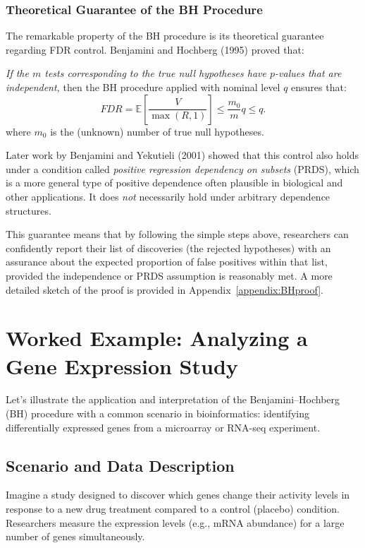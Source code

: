 \documentclass[12pt]{book}
\newcommand{\E}{\mathbb{E}}              %
\newcommand{\FDR}{{FDR}}    %
\newcommand{\pvalue}{$p$-value}          %
\begin{document}
\subsection{Theoretical Guarantee of the BH Procedure}
The remarkable property of the BH procedure is its theoretical guarantee regarding FDR control. Benjamini and Hochberg (1995) proved that:

\emph{If the $m$ tests corresponding to the true null hypotheses have \pvalue s that are independent,} then the BH procedure applied with nominal level $q$ ensures that:
\begin{equation}
  \FDR = \E\left[ \frac{V}{\max(R,1)} \right] \le \frac{m_0}{m} q \le q. \label{eq:bh_control}
\end{equation}
where $m_0$ is the (unknown) number of true null hypotheses.

Later work by Benjamini and Yekutieli (2001) showed that this control also holds under a condition called \emph{positive regression dependency on subsets} (PRDS), which is a more general type of positive dependence often plausible in biological and other applications. It does \emph{not} necessarily hold under arbitrary dependence structures.

This guarantee means that by following the simple steps above, researchers can confidently report their list of discoveries (the rejected hypotheses) with an assurance about the expected proportion of false positives within that list, provided the independence or PRDS assumption is reasonably met. A more detailed sketch of the proof is provided in Appendix~\ref{appendix:BHproof}.

\chapter{Worked Example: Analyzing a Gene Expression Study}
\label{chap:example}

Let's illustrate the application and interpretation of the Benjamini–Hochberg (BH) procedure with a common scenario in bioinformatics: identifying differentially expressed genes from a microarray or RNA-seq experiment.

\section{Scenario and Data Description}
Imagine a study designed to discover which genes change their activity levels in response to a new drug treatment compared to a control (placebo) condition. Researchers measure the expression levels (e.g., mRNA abundance) for a large number of genes simultaneously.
\end{document}
